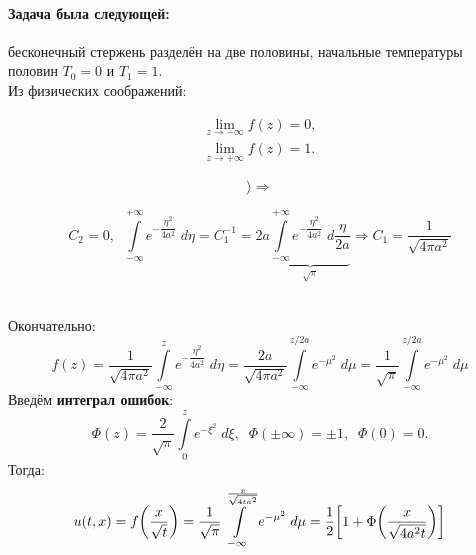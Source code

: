 \documentclass[../main.tex]{subfiles}
\begin{document}
\paragraph{Задача была следующей:} бесконечный стержень разделён на две половины, начальные температуры половин $T_0 = 0$ и $T_1 = 1$. \\
Из физических соображений: \\
\begin{minipage}[c]{0.2\textwidth}
\begin{flushright}
\begin{align*}
	\lim\limits_{z \to - \infty} f(z) = 0, \\
	\lim\limits_{z \to + \infty} f(z) = 1.
\end{align*}
\end{flushright}
\end{minipage}
\begin{minipage}[c]{0\textwidth}
$$\biggr\rangle \Longrightarrow$$
\end{minipage}
\begin{minipage}[c]{0.7\textwidth}
\vspace{30pt}
$$\boxed{C_2 = 0}, \; \; \int\limits_{-\infty}^{+\infty} e^{-\dfrac{\eta^2}{4a^2}}\;d \eta = C_1^{-1} = 2a \underbrace{\int\limits_{-\infty}^{+\infty} e^{-\dfrac{\eta^2}{4a^2}}\;d \dfrac{\eta}{2a}}_{\sqrt{\pi}} \Rightarrow \boxed{C_1 = \dfrac{1}{\sqrt{4 \pi a^2}}}$$
\end{minipage} \\
Окончательно:
\begin{equation*}
	f(z) = \dfrac{1}{\sqrt{4 \pi a^2}}\int\limits_{-\infty}^{z} e^{-\dfrac{\eta^2}{4a^2}}\;d \eta = \dfrac{2a}{\sqrt{4 \pi a^2}} \int\limits_{-\infty}^{z/2a}e^{-\mu^2}\;d \mu = \dfrac{1}{\sqrt{\pi}} \int\limits_{-\infty}^{z/2a}e^{-\mu^2}\;d \mu 
\end{equation*}
Введём \textbf{интеграл ошибок}:
\begin{equation*}
	\Phi(z) = \dfrac{2}{\sqrt{\pi}} \int\limits_{0}^{z}e^{-\xi^2}\;d \xi,\; \; \Phi(\pm \infty) = \pm 1,\; \; \Phi(0) = 0. 
\end{equation*}
Тогда:
\begin{equation*}
	u(t, x) = f\biggl(\dfrac{x}{\sqrt{t}}\biggr) = \dfrac{1}{\sqrt{\pi}} \int\limits_{-\infty}^{\frac{x}{\sqrt{4 t a^2}}} e^{-\mu^2}\;d \mu = \dfrac{1}{2}\biggl[1 + \Phi\biggl(\dfrac{x}{\sqrt{4 a^2 t}}\biggr)\biggr]
\end{equation*}
\end{document}
